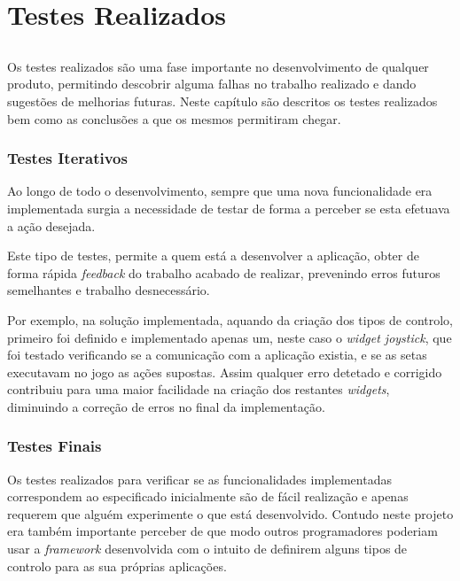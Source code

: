 \chapter{Testes Realizados} \label{chap:testes}

\section*{}

Os testes realizados são uma fase importante no desenvolvimento de qualquer produto, permitindo descobrir alguma falhas no trabalho realizado e dando sugestões de melhorias futuras.
Neste capítulo são descritos os testes realizados bem como as conclusões a que os mesmos permitiram chegar.

\subsection*{Testes Iterativos}

	Ao longo de todo o desenvolvimento, sempre que uma nova funcionalidade era implementada surgia a necessidade de testar de forma a perceber se esta efetuava a ação desejada.

	Este tipo de testes, permite a quem está a desenvolver a aplicação, obter de forma rápida \textit{feedback} do trabalho acabado de realizar, prevenindo erros futuros semelhantes e trabalho desnecessário.

	Por exemplo, na solução implementada, aquando da criação dos tipos de controlo, primeiro foi definido e implementado apenas um, neste caso o \textit{widget joystick}, que foi testado verificando se a comunicação com a aplicação existia, e se as setas executavam no jogo as ações supostas. Assim qualquer erro detetado e corrigido contribuiu para uma maior facilidade na criação dos restantes \textit{widgets}, diminuindo a correção de erros no final da implementação.

\subsection*{Testes Finais}
	
	Os testes realizados para verificar se as funcionalidades implementadas correspondem ao especificado inicialmente são de fácil realização e apenas requerem que alguém experimente o que está desenvolvido. Contudo neste projeto era também importante perceber de que modo outros programadores poderiam usar a \textit{framework} desenvolvida com o intuito de definirem alguns tipos de controlo para as sua próprias aplicações.

